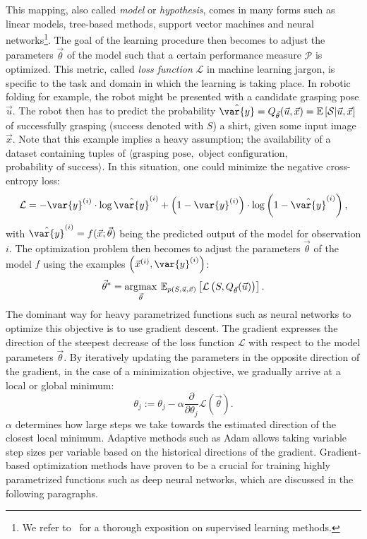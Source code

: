 \documentclass[\home/main.tex]{subfiles}
\begin{document}
This mapping, also called \textit{model} or \textit{hypothesis}, comes in many forms such as linear models, tree-based methods, support vector machines and neural networks\footnote{We refer to~\textcite{Murphy2012, Bishop2006, Hastie2001} for a thorough exposition on supervised learning methods.}.
The goal of the learning procedure then becomes to adjust the parameters $\vec{\theta}$ of the model such that a certain performance measure $\mathcal{P}$ is optimized. This metric, called \textit{loss function} $\mathcal{L}$ in machine learning jargon, is specific to the task and domain in which the learning is taking place. In robotic folding for example, the robot might be presented with a candidate grasping pose $\vec{u}$. The robot then has to predict the probability $\hat{\var{y}} = Q_{\vec{\theta}}(\vec{u}, \vec{x}) = \mathbb{E}\left[ \mathcal{S} | \vec{u}, \vec{x} \right]$ of successfully grasping (success denoted with $S$) a shirt, given some input image $\vec{x}$. Note that this example implies a heavy assumption; the availability of a dataset containing tuples of $ \langle\text{grasping pose}, $ $\text{object configuration},$ $\text{probability of success} \rangle$.
In this situation, one could minimize the negative cross-entropy loss:
\begin{equation*}
	\mathcal{L}=-\var{y}^{(i)} \cdot \log \hat{\var{y}}^{(i)} +\left(1-\var{y}^{(i)}\right) \cdot \log \left(1-\hat{\var{y}}^{(i)}\right),
\end{equation*} with $\hat{\var{y}}^{(i)} = f(\vec{x};\vec{\theta})$ being the predicted output of the model for observation $i$.
The optimization problem then becomes to adjust the parameters $\vec{\theta}$ of the model $f$ using the examples $\left(\vec{x}^{(i)}, \var{y}^{(i)}\right)$:
\begin{equation*}
	\vec{\theta}^{*}=\operatorname*{\arg\!\max}_{\vec{\theta}} \: \mathbb{E}_{p(S, \vec{u}, \vec{x})}\left[\mathcal{L}\left(S, Q_{\vec{\theta}}(\vec{u})\right)\right].
\end{equation*}
The dominant way for heavy parametrized functions such as neural networks to optimize this objective is to use gradient descent. The gradient expresses the direction of the steepest decrease of the loss function $\mathcal{L}$ with respect to the model parameters $\vec{\theta}$. By iteratively updating the parameters in the opposite direction of the gradient, in the case of a minimization objective, we gradually arrive at a local or global minimum:
\begin{equation*}
	\theta_{j}:=\theta_{j}-\alpha \frac{\partial}{\partial \theta_{j}} \mathcal{L}(\vec{\theta}).
\end{equation*}
$\alpha$ determines how large steps we take towards the estimated direction of the closest local minimum. Adaptive methods such as Adam \autocite{Kingma2014} allows taking variable step sizes per variable based on the historical directions of the gradient. Gradient-based optimization methods have proven to be a crucial for training highly parametrized functions such as deep neural networks, which are discussed in the following paragraphs. 
\end{document}

